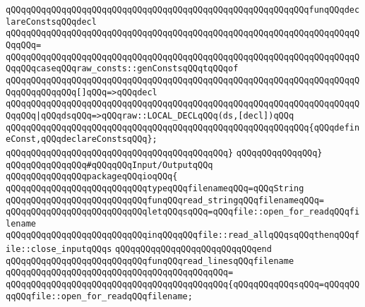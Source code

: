 \newline
\verb|qQQqqQQqqQQqqQQqqQQqqQQqqQQqqQQqqQQqqQQqqQQqqQQqqQQqqQQqqQQqfunqQQqdeclareConstsqQQqdecl|\newline
\verb|qQQqqQQqqQQqqQQqqQQqqQQqqQQqqQQqqQQqqQQqqQQqqQQqqQQqqQQqqQQqqQQqqQQqqQQqqQQq=|\newline
\verb|qQQqqQQqqQQqqQQqqQQqqQQqqQQqqQQqqQQqqQQqqQQqqQQqqQQqqQQqqQQqqQQqqQQqqQQqqQQqcaseqQQqraw_consts::genConstsqQQqtqQQqof|\newline
\verb|qQQqqQQqqQQqqQQqqQQqqQQqqQQqqQQqqQQqqQQqqQQqqQQqqQQqqQQqqQQqqQQqqQQqqQQqqQQqqQQqqQQq[]qQQq=>qQQqdecl|\newline
\verb|qQQqqQQqqQQqqQQqqQQqqQQqqQQqqQQqqQQqqQQqqQQqqQQqqQQqqQQqqQQqqQQqqQQqqQQqqQQq|\verb#|qQQqdsqQQq=>qQQqraw::LOCAL_DECLqQQq(ds,[decl])qQQq#\newline
\newline
\verb|qQQqqQQqqQQqqQQqqQQqqQQqqQQqqQQqqQQqqQQqqQQqqQQqqQQqqQQqqQQq{qQQqdefineConst,qQQqdeclareConstsqQQq};|\newline
\verb|qQQqqQQqqQQqqQQqqQQqqQQqqQQqqQQqqQQqqQQqqQQq}|\newline
\verb|qQQqqQQqqQQqqQQq}|\newline
\newline
\verb|qQQqqQQqqQQqqQQq#qQQqqQQqInput/OutputqQQq|\newline
\verb|qQQqqQQqqQQqqQQqpackageqQQqioqQQq{|\newline
\newline
\verb|qQQqqQQqqQQqqQQqqQQqqQQqqQQqtypeqQQqfilenameqQQq=qQQqString|\newline
\newline
\verb|qQQqqQQqqQQqqQQqqQQqqQQqqQQqfunqQQqread_stringqQQqfilenameqQQq=|\newline
\verb|qQQqqQQqqQQqqQQqqQQqqQQqqQQqletqQQqsqQQq=qQQqfile::open_for_readqQQqfilename|\newline
\verb|qQQqqQQqqQQqqQQqqQQqqQQqqQQqinqQQqqQQqfile::read_allqQQqsqQQqthenqQQqfile::close_inputqQQqs|\newline
\verb|qQQqqQQqqQQqqQQqqQQqqQQqqQQqend|\newline
\newline
\verb|qQQqqQQqqQQqqQQqqQQqqQQqqQQqfunqQQqread_linesqQQqfilename|\newline
\verb|qQQqqQQqqQQqqQQqqQQqqQQqqQQqqQQqqQQqqQQqqQQq=|\newline
\verb|qQQqqQQqqQQqqQQqqQQqqQQqqQQqqQQqqQQqqQQqqQQq{qQQqqQQqqQQqsqQQq=qQQqqQQqqQQqfile::open_for_readqQQqfilename;|\newline
\newline
